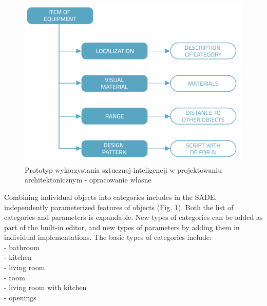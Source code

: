 \documentclass[runningheads]{llncs}
\begin{document}
\begin{figure}[H]
\centering
\includegraphics[width=\textwidth]{graf.png}
\caption{Prototyp wykorzystania sztucznej inteligencji w projektowaniu architektonicznym - 
opracowanie własne} \label{fig1}
\end{figure}

Combining individual objects into categories includes in the SADE, independently parameterized features of objects (Fig. 1). Both the list of categories and parameters is expandable. New types of categories can be added as part of the built-in editor, and new types of parameters by adding them in individual implementations.
The basic types of categories include:\\
- bathroom\\
- kitchen\\
- living room\\
- room\\
- living room with kitchen\\
- openings\\
\end{document}
